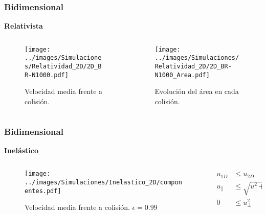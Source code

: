 \documentclass{beamer}
\begin{document}
\begin{frame}
    \frametitle[prueb1]{Bidimensional}{}
    \centering
    \textbf{Relativista}
    \vspace{-0.5cm}
    \begin{columns}
        \hspace{-0.cm}
        \begin{column}{0.5\textwidth}
            \begin{figure}
                \centering
                \texttt{[image: ../images/Simulaciones/Relatividad\_2D/2D\_BR-N1000.pdf]}
                \caption{Velocidad media frente a colisión.}
            \end{figure}         
        \end{column}
        \begin{column}{0.5\textwidth}
            \begin{figure}
                \centering 
                \captionsetup{justification=centering}
                \vspace{0.4cm}
                \texttt{[image: ../images/Simulaciones/Relatividad\_2D/2D\_BR-N1000\_Area.pdf]}
                \caption{Evolución del área en cada colisión.}
            \end{figure}
        \end{column}
    \end{columns}
\end{frame}

\begin{frame}[t]
    \frametitle[prueb1]{Bidimensional}{}
    \centering
    \textbf{Inelástico}
    \vspace{-0.5cm}
    \begin{columns}
        \begin{column}{0.5\textwidth}
            \begin{figure}
                \centering
                \texttt{[image: ../images/Simulaciones/Inelastico\_2D/componentes.pdf]}
                \caption{Velocidad media frente a colisión. \( \epsilon = 0.99 \)}  
            \end{figure}         
        \end{column}
    \begin{column}{0.5\textwidth}
        \begin{align*}
            u_{1D} &\leq u_{2D} \nonumber\\
            u_{\parallel} &\leq \sqrt{u_\parallel^2 + u_\perp^2}\\
             0 &\leq u_\perp^2 \nonumber
        \end{align*}
    \end{column}
    \end{columns}
\end{frame}
\end{document}
